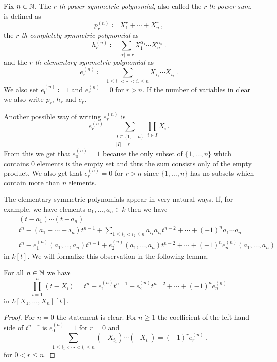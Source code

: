 \begin{definition}
  Fix $n \in \mathbb{N}$.
  The \emph{$r$-th power symmetric polynomial}, also called the \emph{$r$-th power sum}, is defined as
  \[
              p_r^{(n)}
    \coloneqq X_1^r + \dotsb + X_n^r \,,
  \]
  the \emph{$r$-th completely symmetric polynomial} as
  \[
              h_r^{(n)}
    \coloneqq \sum_{|\alpha|=r} X_1^{\alpha_1} \dotsm X_n^{\alpha_n} \,.
  \]
  and the \emph{$r$-th elementary symmetric polynomial} as
  \[
              e_r^{(n)}
    \coloneqq \sum_{1 \leq i_1 < \dotsb < i_r \leq n} X_{i_1} \dotsm X_{i_r} \,.
  \]
  We also set $e_0^{(n)} \coloneqq 1$ and $e_r^{(n)} = 0$ for $r > n$.
  If the number of variables in clear we also write $p_r$, $h_r$ and $e_r$.
\end{definition}

Another possible way of writing $e^{(n)}_r$ is
\[
    e^{(n)}_r
  = \sum_{\substack{I \subseteq \{1, \dotsc, n\} \\ |I| = r}} \prod_{i \in I} X_i \,.
\]
From this we get that $e^{(n)}_0 = 1$ because the only subset of $\{1, \dotsc, n\}$ which contains $0$ elements is the empty set and thus the sum consists only of the empty product.
We also get that $e^{(n)}_r = 0$ for $r > n$ since $\{1, \dotsc, n\}$ has no subsets which contain more than $n$ elements.

The elementary symmetric polynomials appear in very natural ways.
If, for example, we have elements $a_1, \dotsc, a_n \in k$ then we have
\begin{align*}
   &\, (t-a_1) \dotsm (t-a_n) \\
  =&\, t^n - (a_1 + \dotsb + a_n) t^{n-1} + \sum_{1 \leq i_1 < i_2 \leq n} a_{i_1} a_{i_2} t^{n-2} + \dotsb + (-1)^n a_1 \dotsm a_n \\ 
  =&\, t^n - e^{(n)}_1(a_1, \dotsc, a_n) t^{n-1} + e^{(n)}_2(a_1, \dotsc, a_n) t^{n-2} + \dotsb + (-1)^n e^{(n)}_n(a_1, \dotsc, a_n)
\end{align*}
in $k[t]$.
We will formalize this observation in the following lemma.


\begin{lemma}
  For all $n \in \mathbb{N}$ we have
  \[
      \prod_{i=1}^n (t-X_i)
    = t^n - e^{(n)}_1 t^{n-1} + e^{(n)}_2 t^{n-2} + \dotsb + (-1)^n e^{(n)}_n
  \]
  in $k[X_1, \dotsc, X_n][t]$.
\end{lemma}
\begin{proof}
  For $n = 0$ the statement is clear.
  For $n \geq 1$ the coefficient of the left-hand side of $t^{n-r}$ is $e^{(n)}_0 = 1$ for $r = 0$ and
  \[
      \sum_{1 \leq i_1 < \dotsb < i_r \leq n} (-X_{i_1}) \dotsm (-X_{i_r})
    = (-1)^r e^{(n)}_r \,.
  \]
  for $0 < r \leq n$.
\end{proof}


